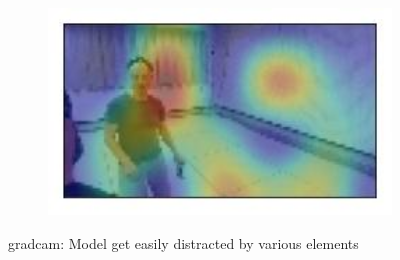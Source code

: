 \begin{figure}[!h]
\begin{center}
\begin{subfigure}[h]{0.24\textwidth}
		\end{subfigure}
		\hfill
		\begin{subfigure}[h]{0.24\textwidth}
			\centering
			\includegraphics[width=1\textwidth]{"contents/images/gradcam/gradcam-random-4"}
		\end{subfigure}
	\end{center}
	\vspace{-0.5cm}
	\caption[\gls{gradcam}: Model gets easily distracted by various elements]{\gls{gradcam}: Model get easily distracted by various elements}
	\label{fig:gradcam-random}
\end{figure}

